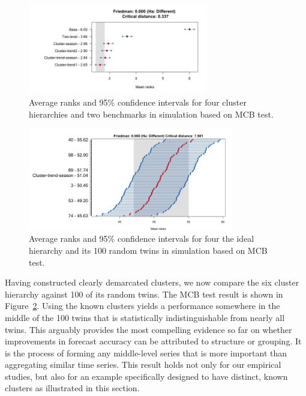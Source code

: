 \documentclass[a4paper,review,12pt,authoryear]{elsarticle}
\begin{document}
\begin{figure}[h!]
    \centering
    \vspace{0.1in}\includegraphics[width=0.7\textwidth]{../figures/Figure10.jpg}
   \vspace{-0.1in}
\caption{\label{fig:simu_P3_benchmarks}Average ranks and 95\% confidence intervals for four cluster hierarchies and two benchmarks in simulation based on MCB test.}
\end{figure}

\begin{figure}[h!]
    \centering
\includegraphics[width=0.8\textwidth]{../figures/Figure11.jpg}
    \vspace{-0.1in}
    \caption{Average ranks and 95\% confidence intervals for four the ideal hierarchy and its 100 random twins in simulation based on MCB test.}
    \label{fig:simu_P3_c_vs_pc}
\end{figure}


Having constructed clearly demarcated clusters, we now compare the six cluster hierarchy against 100 of its random twins.  The MCB test result is shown in Figure~\ref{fig:simu_P3_c_vs_pc}. Using the known clusters yields a performance somewhere in the middle of the 100 twins that is statistically indistinguishable from nearly all twins. %
This arguably provides the most compelling evidence so far on whether improvements in forecast accuracy can be attributed to structure or grouping. It is the process of forming any middle-level series that is more important than aggregating similar time series. This result holds not only for our empirical studies, but also for an example specifically designed to have distinct, known clusters as illustrated in this section.
\end{document}
